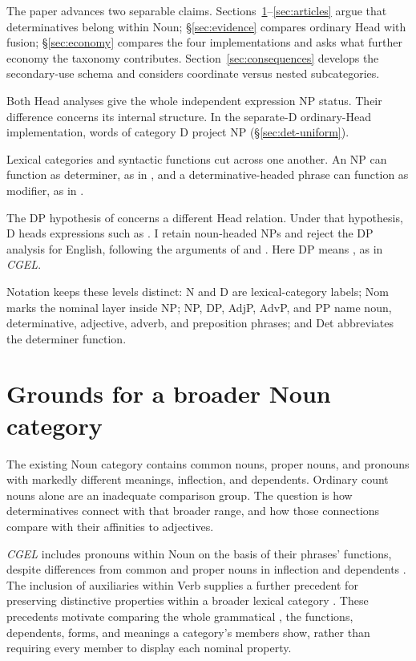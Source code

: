 \documentclass[12pt]{article}
\begin{document}
The paper advances two separable claims. Sections~\ref{sec:proposal}--\ref{sec:articles} argue that determinatives belong within Noun; §\ref{sec:evidence} compares ordinary Head with fusion; §\ref{sec:economy} compares the four implementations and asks what further economy the taxonomy contributes. Section~\ref{sec:consequences} develops the secondary-use schema and considers coordinate versus nested subcategories.

Both Head analyses give the whole independent expression NP status. Their difference concerns its internal structure. In the separate-D ordinary-Head implementation, words of category D project NP (§\ref{sec:det-uniform}).

Lexical categories and syntactic functions cut across one another. An NP can function as determiner, as in , and a determinative-headed phrase can function as modifier, as in  \citep{payne2010,pullummiller2022nps}.

The DP hypothesis of \textcite{abney1987} concerns a different Head relation. Under that hypothesis, D heads expressions such as . I retain noun-headed NPs and reject the DP analysis for English, following the arguments of \textcite{pullummiller2022nps} and \textcite{bruening2020nominal}. Here DP means , as in \textit{CGEL}.

Notation keeps these levels distinct: N and D are lexical-category labels; Nom marks the nominal layer inside NP; NP, DP, AdjP, AdvP, and PP name noun, determinative, adjective, adverb, and preposition phrases; and Det abbreviates the determiner function.

\section{Grounds for a broader Noun category}\label{sec:proposal}

The existing Noun category contains common nouns, proper nouns, and pronouns with markedly different meanings, inflection, and dependents. Ordinary count nouns alone are an inadequate comparison group. The question is how determinatives connect with that broader range, and how those connections compare with their affinities to adjectives.

\textit{CGEL} includes pronouns within Noun on the basis of their phrases' functions, despite differences from common and proper nouns in inflection and dependents \citep[327--328]{huddleston2002}. The inclusion of auxiliaries within Verb supplies a further precedent for preserving distinctive properties within a broader lexical category \citep{pullumwilson1977}. These precedents motivate comparing the whole grammatical , the functions, dependents, forms, and meanings a category's members show, rather than requiring every member to display each nominal property.
\end{document}
